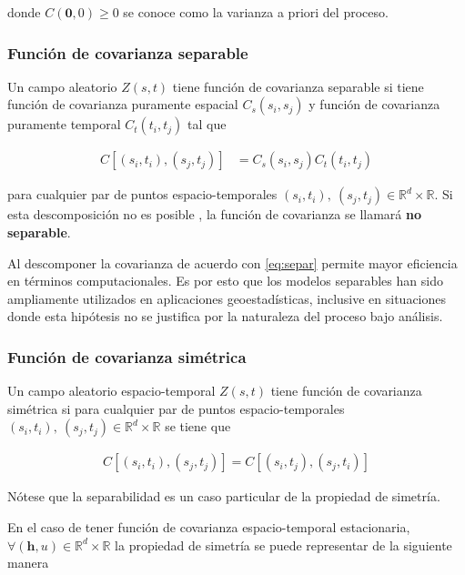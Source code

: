 \documentclass[
]{book}
\begin{document}
donde \(C(\boldsymbol 0,0) \geq 0\) se conoce como la varianza a priori del proceso.

\hypertarget{funciuxf3n-de-covarianza-separable}{%
\subsubsection*{Función de covarianza separable}\label{funciuxf3n-de-covarianza-separable}}

Un campo aleatorio \(Z(s,t)\) tiene función de covarianza separable si tiene función de covarianza puramente espacial \(C_s(s_i,s_j)\) y función de covarianza puramente temporal \(C_t(t_i,t_j)\) tal que

\begin{align}
C[(s_i,t_i),(s_j,t_j)]&=C_s(s_i,s_j)C_t(t_i,t_j) 
\label{eq:separ}
\end{align}

para cualquier par de puntos espacio-temporales \((s_i,t_i),\ (s_j,t_j)\in \mathbb{R}^d\times \mathbb{R}\). Si esta descomposición no es posible , la función de covarianza se llamará \textbf{no separable}.

Al descomponer la covarianza de acuerdo con \eqref{eq:separ} permite mayor eficiencia en términos computacionales. Es por esto que los modelos separables han sido ampliamente utilizados en aplicaciones geoestadísticas, inclusive en situaciones donde esta hipótesis no se justifica por la naturaleza del proceso bajo análisis.

\hypertarget{funciuxf3n-de-covarianza-simuxe9trica}{%
\subsubsection*{Función de covarianza simétrica}\label{funciuxf3n-de-covarianza-simuxe9trica}}

Un campo aleatorio espacio-temporal \(Z(s,t)\) tiene función de covarianza simétrica si para cualquier par de puntos espacio-temporales \((s_i,t_i),\ (s_j,t_j)\in \mathbb{R}^d \times \mathbb{R}\) se tiene que

\begin{align}
  C[(s_i,t_i),(s_j,t_j)]=C[(s_i,t_j),(s_j,t_i)]
\end{align}

Nótese que la separabilidad es un caso particular de la propiedad de simetría.

En el caso de tener función de covarianza espacio-temporal estacionaria, \(\forall (\textbf{h},u)\in \mathbb{R}^d \times \mathbb{R}\) la propiedad de simetría se puede representar de la siguiente manera
\end{document}
